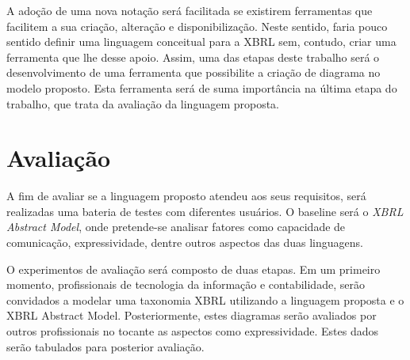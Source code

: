 \documentclass[msc,proposal,hidelot,hideabstract]{ppgccufmg} %
\begin{document}
A adoção de uma nova notação será facilitada se existirem ferramentas que facilitem a sua criação, alteração e disponibilização. Neste sentido, faria pouco sentido definir uma linguagem conceitual para a XBRL sem, contudo, criar uma ferramenta que lhe desse apoio. Assim, uma das etapas deste trabalho será o desenvolvimento de uma ferramenta que possibilite a criação de diagrama no modelo proposto. Esta ferramenta será de suma importância na última etapa do trabalho, que trata da avaliação da linguagem proposta.

\section{Avaliação}
\label{sec:avaliacao}

A fim de avaliar se a linguagem proposto atendeu aos seus requisitos, será realizadas uma bateria de testes com diferentes usuários. O baseline será o \textit{XBRL Abstract Model}, onde pretende-se analisar fatores como capacidade de comunicação, expressividade, dentre outros aspectos das duas linguagens.

O experimentos de avaliação será composto de duas etapas. Em um primeiro momento, profissionais de tecnologia da informação e contabilidade, serão convidados a modelar uma taxonomia XBRL utilizando a linguagem proposta e o XBRL Abstract Model. Posteriormente, estes diagramas serão avaliados por outros profissionais no tocante as aspectos como expressividade. Estes dados serão tabulados para posterior avaliação.
\end{document}
